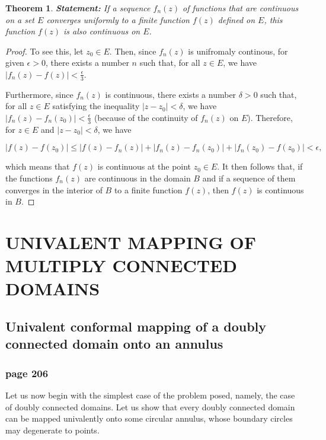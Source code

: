 \documentclass[
]{book}
\newtheorem{theorem}{Theorem}[chapter]
\theoremstyle{definition}
\theoremstyle{definition}
\theoremstyle{definition}
\theoremstyle{definition}
\theoremstyle{remark}
\begin{document}
\begin{theorem}
\protect\hypertarget{thm:unnamed-chunk-11}{}\label{thm:unnamed-chunk-11}\textbf{Statement:} If a sequence \(f_n (z)\) of functions that are continuous on a set \(E\) converges uniformly to a finite function \(f(z)\) defined on \(E\), this function \(f(z)\) is also continuous on \(E\).
\end{theorem}

\begin{proof}
To see this, let \(z_0 \in E\). Then, since \(f_n(z)\) is unifromaly continous, for given \(\epsilon > 0\), there exists a number \(n\) such that, for all \(z \in E\), we have \(|f_n (z) - f(z)| < \frac{\epsilon}{3}\).

Furthermore, since \(f_n(z)\) is continuous, there exists a number \(\delta > 0\) such that, for all \(z \in E\) satisfying the inequality \(|z - z_0| < \delta\), we have \(|f_n (z) - f_n (z_0)| < \frac{\epsilon}{3}\) (because of the continuity of \(f_n (z)\) on \(E\)). Therefore, for \(z \in E\) and \(|z - z_0| < \delta\), we have

\[
|f(z)-f(z_0)| \leq |f(z)- f_n (z)| + |f_n (z) - f_n (z_0)| + |f_n (z_0) -f(z_0)| < \epsilon,
\]

which means that \(f(z)\) is continuous at the point \(z_0 \in E\). It then follows that, if the functions \(f_n (z)\) are continuous in the domain \(B\) and if a sequence of them converges in the interior of \(B\) to a finite function \(f(z)\), then \(f(z)\) is continuous in \(B\).
\end{proof}

\chapter{UNIVALENT MAPPING OF MULTIPLY CONNECTED DOMAINS}\label{univalent-mapping-of-multiply-connected-domains}

\section{Univalent conformal mapping of a doubly connected domain onto an annulus}\label{univalent-conformal-mapping-of-a-doubly-connected-domain-onto-an-annulus}

\subsection{page 206}\label{page-206}

Let us now begin with the simplest case of the problem posed, namely, the
case of doubly connected domains. Let us show that every doubly connected
domain can be mapped univalently onto some circular annulus, whose boundary
circles may degenerate to points.
\end{document}
